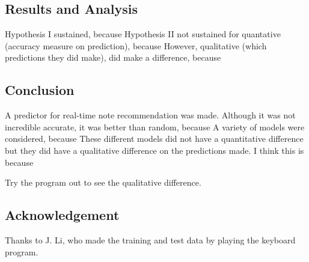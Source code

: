 \documentclass{article}
\begin{document}
\subsection*{Results and Analysis}
Hypothesis I sustained, because %
Hypothesis II not sustained for quantative (accuracy measure on prediction), because %
However, qualitative (which predictions they did make), did make a difference, because %

\subsection*{Conclusion}
A predictor for real-time note recommendation was made.
Although it was not incredible accurate, it was better than random, because %
A variety of models were considered, because %
These different models did not have a quantitative difference but they did have a qualitative difference on the predictions made. I think this is because %

Try the program out to see the qualitative difference.

\subsection*{Acknowledgement}
Thanks to J. Li, who made the training and test data by playing the keyboard program.
\end{document}
